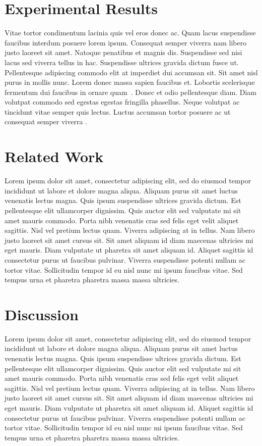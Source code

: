 \documentclass[akbc,twoside,11pt,lettersize]{article}
\begin{document}
\section{Experimental Results}

\label{results}

Vitae tortor condimentum lacinia quis vel eros donec ac. Quam lacus suspendisse faucibus interdum posuere lorem ipsum. Consequat semper viverra nam libero justo laoreet sit amet. Natoque penatibus et magnis dis. Suspendisse sed nisi lacus sed viverra tellus in hac. Suspendisse ultrices gravida dictum fusce ut. Pellentesque adipiscing commodo elit at imperdiet dui accumsan sit. Sit amet nisl purus in mollis nunc. Lorem donec massa sapien faucibus et. Lobortis scelerisque fermentum dui faucibus in ornare quam~\cite{papad}. Donec et odio pellentesque diam. Diam volutpat commodo sed egestas egestas fringilla phasellus. Neque \cite{min-aaai} volutpat ac tincidunt vitae semper quis lectus. Luctus accumsan tortor posuere ac ut consequat semper viverra \cite{simmons-aaai88,hacker}.

\section{Related Work}
\label{analysis}

Lorem ipsum dolor sit amet, consectetur adipiscing elit, sed do eiusmod tempor incididunt ut labore et dolore magna aliqua. Aliquam purus sit amet luctus venenatis lectus magna. Quis ipsum suspendisse ultrices gravida dictum. Est pellentesque elit ullamcorper dignissim. Quis auctor elit sed vulputate mi sit amet mauris commodo. Porta nibh venenatis cras sed felis eget velit aliquet sagittis. Nisl vel pretium lectus quam. Viverra adipiscing at in tellus. Nam libero justo laoreet sit amet cursus sit. Sit amet aliquam id diam maecenas ultricies mi eget mauris. Diam vulputate ut pharetra sit amet aliquam id. Aliquet sagittis id consectetur purus ut faucibus pulvinar. Viverra suspendisse potenti nullam ac tortor vitae. Sollicitudin tempor id eu nisl nunc mi ipsum faucibus vitae. Sed tempus urna et pharetra pharetra massa massa ultricies.

\section{Discussion}

Lorem ipsum dolor sit amet, consectetur adipiscing elit, sed do eiusmod tempor incididunt ut labore et dolore magna aliqua. Aliquam purus sit amet luctus venenatis lectus magna. Quis ipsum suspendisse ultrices gravida dictum. Est pellentesque elit ullamcorper dignissim. Quis auctor elit sed vulputate mi sit amet mauris commodo. Porta nibh venenatis cras sed felis eget velit aliquet sagittis. Nisl vel pretium lectus quam. Viverra adipiscing at in tellus. Nam libero justo laoreet sit amet cursus sit. Sit amet aliquam id diam maecenas ultricies mi eget mauris. Diam vulputate ut pharetra sit amet aliquam id. Aliquet sagittis id consectetur purus ut faucibus pulvinar. Viverra suspendisse potenti nullam ac tortor vitae. Sollicitudin tempor id eu nisl nunc mi ipsum faucibus vitae. Sed tempus urna et pharetra pharetra massa massa ultricies.




\end{document}
